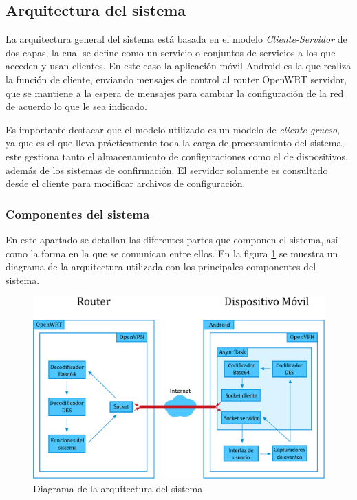 \documentclass[12pt, twoside]{article}
\begin{document}
    \subsection{Arquitectura del sistema}

        La arquitectura general del sistema está basada en el modelo \textit{Cliente-Servidor} de dos capas, la cual se define como un servicio o conjuntos de servicios a los que acceden y usan clientes. En este caso la aplicación móvil Android es la que realiza la función de cliente, enviando mensajes de control al router OpenWRT servidor, que se mantiene a la espera de mensajes para cambiar la configuración de la red de acuerdo lo que le sea indicado.

        Es importante destacar que el modelo utilizado es un modelo de \textit{cliente grueso}, ya que es el que lleva prácticamente toda la carga de procesamiento del sistema, este gestiona tanto el almacenamiento de configuraciones como el de dispositivos, además de los sistemas de confirmación. El servidor solamente es consultado desde el cliente para modificar archivos de configuración.

        \subsubsection{Componentes del sistema}
            En este apartado se detallan las diferentes partes que componen el sistema, así como la forma en la que se comunican entre ellos. En la figura \ref{fig:system_diagram} se muestra un diagrama de la arquitectura utilizada con los principales componentes del sistema.

            \begin{figure}[h!]
            \centering
                \includegraphics[scale=0.5]{system_diagram.eps}
                \caption{Diagrama de la arquitectura del sistema}
                \label{fig:system_diagram}
            \end{figure}
\end{document}
